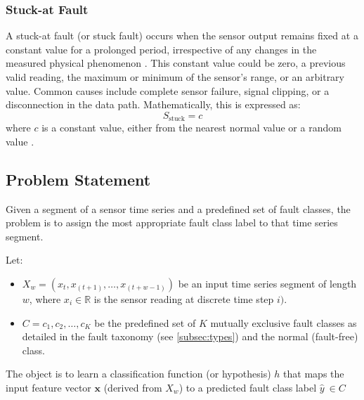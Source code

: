 \subsubsection{Stuck-at Fault}
A stuck-at fault (or stuck fault) occurs when the sensor output remains fixed at a constant value for a prolonged period, irrespective of any changes in the measured physical phenomenon \cite{Saeed2021, Hasan2024, Shi2024}. This constant value could be zero, a previous valid reading, the maximum or minimum of the sensor's range, or an arbitrary value. Common causes include complete sensor failure, signal clipping, or a disconnection in the data path. Mathematically, this is expressed as:
\[S_\text{stuck} = c\]
where \(c\) is a constant value, either from the nearest normal value or a random value \cite{Saeed2021, Hasan2024, Shi2024}.


\subsection{Problem Statement}
Given a segment of a sensor time series and a predefined set of fault classes, the problem is to assign the most appropriate fault class label to that time series segment.

Let:
\begin{itemize}
  \item \(X_w = (x_t, x_(t+1), \ldots, x_(t+w-1))\) be an input time series segment of length \(w\), where \(x_i \in \mathbb{R}\) is the sensor reading at discrete time step \(i)\).
  \item \(C = {c_1, c_2, \ldots, c_K}\) be the predefined set of \(K\) mutually exclusive fault classes as detailed in the fault taxonomy (see \ref{subsec:types}) and the normal (fault-free) class.
\end{itemize}

The object is to learn a classification function (or hypothesis) \(h\) that maps the input feature vector \(\mathbf{x}\) (derived from \(X_w\)) to a predicted fault class label \(\hat{y}\ \in C\)
